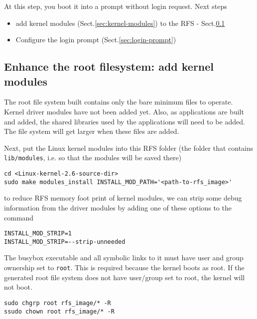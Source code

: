 At this step, you boot it into a prompt without login request. 
Next steps
\begin{itemize}
  \item add kernel modules (Sect.\ref{sec:kernel-modules}) to the RFS -
  Sect.\ref{sec:add-kernel-modules-to-RFS}
  
  \item Configure the login prompt (Sect.\ref{sec:login-prompt})
\end{itemize}

\subsection{Enhance the root filesystem: add kernel modules}
\label{sec:add-kernel-modules-to-RFS}

The root file system built contains only the bare minimum files to operate.
Kernel driver modules have not been added yet. Also, as applications are built
and added, the shared libraries used by the applications will need to be added.
The file system will get larger when these files are added.

Next, put the Linux kernel modules into this RFS folder (the folder that
contains \verb!lib/modules!, i.e. so that the modules will be saved there)

\begin{verbatim}
cd <Linux-kernel-2.6-source-dir>
sudo make modules_install INSTALL_MOD_PATH='<path-to-rfs_image>'
\end{verbatim}
to reduce RFS memory foot print of kernel modules, we can strip some debug information from the
driver modules by adding one of these options to the command
\begin{verbatim}
INSTALL_MOD_STRIP=1
INSTALL_MOD_STRIP=--strip-unneeded
\end{verbatim}

The busybox executable and all symbolic links to it must have user and group
ownership set to \verb!root!. This is required because the kernel boots as
root. If the generated root file system does not have user/group set to root,
the kernel will not boot.
\begin{verbatim}
sudo chgrp root rfs_image/* -R
ssudo chown root rfs_image/* -R
\end{verbatim}

